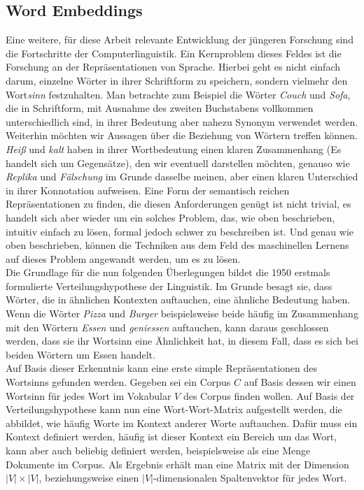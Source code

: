 \subsection{Word Embeddings}
Eine weitere, für diese Arbeit relevante Entwicklung der jüngeren Forschung sind die Fortschritte der Computerlinguistik. Ein Kernproblem dieses Feldes ist die Forschung an der Repräsentationen von Sprache. Hierbei geht es nicht einfach darum, einzelne Wörter in ihrer Schriftform zu speichern, sondern vielmehr den Wort\emph{sinn} festzuhalten. Man betrachte zum Beispiel die Wörter \emph{Couch} und \emph{Sofa}, die in Schriftform, mit Ausnahme des zweiten Buchstabens vollkommen unterschiedlich sind, in ihrer Bedeutung aber nahezu Synonym verwendet werden. Weiterhin möchten wir Aussagen über die Beziehung von Wörtern treffen können. \emph{Heiß} und \emph{kalt} haben in ihrer Wortbedeutung einen klaren Zusammenhang (Es handelt sich um Gegensätze), den wir eventuell darstellen möchten, genauso wie \emph{Replika} und \emph{Fälschung} im Grunde dasselbe meinen, aber einen klaren Unterschied in ihrer Konnotation aufweisen.
Eine Form der semantisch reichen Repräsentationen zu finden, die diesen Anforderungen genügt ist nicht trivial, es handelt sich aber wieder um ein solches Problem, das, wie oben beschrieben, intuitiv einfach zu lösen, formal jedoch schwer zu beschreiben ist. Und genau wie oben beschrieben, können die Techniken aus dem Feld des maschinellen Lernens auf dieses Problem angewandt werden, um es zu lösen. \\

Die Grundlage für die nun folgenden Überlegungen bildet die 1950 erstmals formulierte Verteilungshypothese der Linguistik. Im Grunde besagt sie, dass Wörter, die in ähnlichen Kontexten auftauchen, eine ähnliche Bedeutung haben. Wenn die Wörter \emph{Pizza} und \emph{Burger} beispielsweise beide häufig im Zusammenhang mit den Wörtern \emph{Essen} und \emph{geniessen} auftauchen, kann daraus geschlossen werden, dass sie ihr Wortsinn eine Ähnlichkeit hat, in diesem Fall, dass es sich bei beiden Wörtern um Essen handelt. \\

Auf Basis dieser Erkenntnis kann eine erste simple Repräsentationen des Wortsinns gefunden werden. Gegeben sei ein Corpus $C$ auf Basis dessen wir einen Wortsinn für jedes Wort im Vokabular $V$ des Corpus finden wollen. Auf Basis der Verteilungshypothese kann nun eine Wort-Wort-Matrix aufgestellt werden, die abbildet, wie häufig Worte im Kontext anderer Worte auftauchen. Dafür muss ein Kontext definiert werden, häufig ist dieser Kontext ein Bereich um das Wort, kann aber auch beliebig definiert werden, beispielsweise als eine Menge Dokumente im Corpus. Als Ergebnis erhält man eine Matrix mit der Dimension $ | V | \times | V | $, beziehungsweise einen $|V|$-dimensionalen Spaltenvektor für jedes Wort.\\

